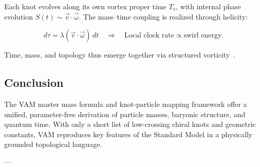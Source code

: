 Each knot evolves along its own vortex proper time $T_v$, with internal phase evolution \( S(t) \sim \vec{v} \cdot \vec{\omega} \). The mass–time coupling is realized through helicity:

\[
d\tau = \lambda (\vec{v} \cdot \vec{\omega}) \, dt
\quad \Rightarrow \quad
\text{Local clock rate} \propto \text{swirl energy}.
\]

Time, mass, and topology thus emerge together via structured vorticity~\cite{Iskandarani2025Timedilation,Iskandarani2025AppendixNow}.

\subsection*{Conclusion}

The VAM master mass formula and knot-particle mapping framework offer a unified, parameter-free derivation of particle masses, baryonic structure, and quantum time. With only a short list of low-crossing chiral knots and geometric constants, VAM reproduces key features of the Standard Model in a physically grounded topological language.

---




